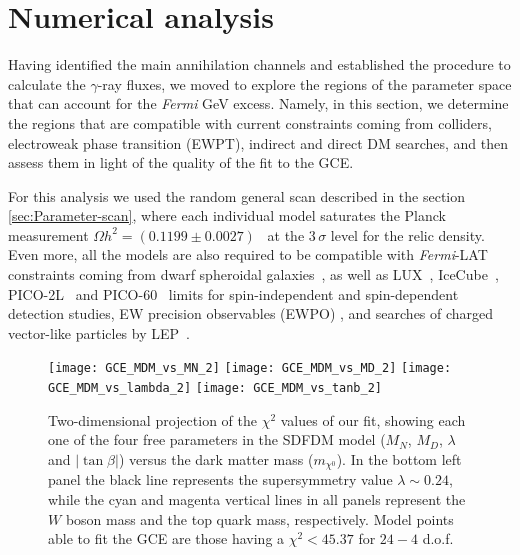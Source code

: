 \section{Numerical analysis}

Having identified the main annihilation channels and established the procedure to calculate the $\gamma$-ray fluxes, we moved to explore the regions of the parameter space that can account for the {\it Fermi} GeV excess. Namely, in this section, we determine the regions that are compatible with current constraints coming from colliders, electroweak phase transition (EWPT), indirect and direct DM searches, and then assess them in light of the quality of the fit to the GCE.  

For this analysis we used the random general scan described in the section \ref{sec:Parameter-scan},    
where each individual model saturates the Planck measurement $\Omega h^2=(0.1199 \pm 0.0027)$~\cite{Ade:2013zuv} at the $3\,\sigma$ level for the relic density. Even more, all the models  are also required to be compatible with \textit{Fermi}-LAT constraints coming from dwarf spheroidal galaxies~\cite{Ackermann:2015zua}, as well as LUX~\cite{Akerib:2013tjd}, IceCube~\cite{2013PhRvL.110m1302A}, PICO-2L~\cite{Amole:2016pye} and PICO-60~\cite{Amole:2015pla}  limits for spin-independent and spin-dependent detection studies, EW precision observables (EWPO) \cite{D'Eramo:2007ga},\cite{Calibbi:2015nha} and searches of charged vector-like particles by LEP~\cite{ALEPH:2005ab}.

\begin{figure}[h]
\begin{center}
\texttt{[image: GCE\_MDM\_vs\_MN\_2]}  \texttt{[image: GCE\_MDM\_vs\_MD\_2]} 
\texttt{[image: GCE\_MDM\_vs\_lambda\_2]}  \texttt{[image: GCE\_MDM\_vs\_tanb\_2]}
\caption{Two-dimensional projection of the $\chi^2$ values of our fit, showing each one of the four free parameters in the SDFDM model ($M_N$, $M_D$, $\lambda$ and $|\tan \beta|$) versus the dark matter mass ($m_{\chi^0}$). 
In the bottom left panel the black line represents the supersymmetry value $\lambda\sim 0.24$, while the cyan and magenta vertical lines in all panels represent the $W$ boson mass and the top quark mass, respectively. Model points able to fit the GCE are those having a $\chi^2<45.37$ for $24-4$ d.o.f.}
\label{fig:parameters}
\end{center}
\end{figure}












